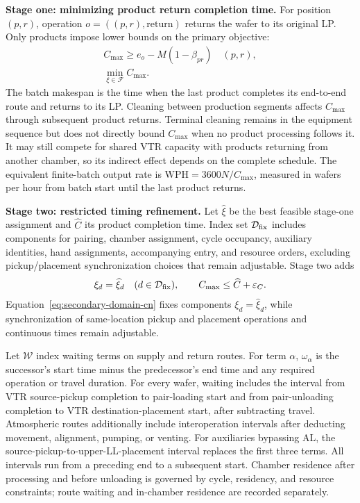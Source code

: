 \documentclass[final,5p,times,twocolumn]{elsarticle}
\begin{document}
\noindent\textbf{Stage one: minimizing product return completion time.}
For position $(p,r)$, operation $o=((p,r),\mathrm{return})$ returns the wafer to its original LP. Only products impose lower bounds on the primary objective:
\begin{equation}
\begin{gathered}
C_{\max}\ge e_o-M(1-\beta_{pr})\quad(p,r),\\
\min_{\xi\in\mathcal F}C_{\max}.
\end{gathered}
\label{eq:primary-objective-cn}
\end{equation}
The batch makespan is the time when the last product completes its end-to-end route and returns to its LP. Cleaning between production segments affects $C_{\max}$ through subsequent product returns. Terminal cleaning remains in the equipment sequence but does not directly bound $C_{\max}$ when no product processing follows it. It may still compete for shared VTR capacity with products returning from another chamber, so its indirect effect depends on the complete schedule. The equivalent finite-batch output rate is $\mathrm{WPH}=3600N/C_{\max}$, measured in wafers per hour from batch start until the last product returns.

\noindent\textbf{Stage two: restricted timing refinement.}
Let $\widehat\xi$ be the best feasible stage-one assignment and $\widehat C$ its product completion time. Index set $\mathcal D_{\rm fix}$ includes components for pairing, chamber assignment, cycle occupancy, auxiliary identities, hand assignments, accompanying entry, and resource orders, excluding pickup/placement synchronization choices that remain adjustable. Stage two adds
\begin{equation}
\begin{gathered}
\xi_d=\widehat\xi_d\quad(d\in\mathcal D_{\rm fix}),\qquad
C_{\max}\le\widehat C+\varepsilon_C.
\end{gathered}
\label{eq:secondary-domain-cn}
\end{equation}
Equation~\eqref{eq:secondary-domain-cn} fixes components $\xi_d=\widehat\xi_d$, while synchronization of same-location pickup and placement operations and continuous times remain adjustable.

Let $\mathcal W$ index waiting terms on supply and return routes. For term $\alpha$, $\omega_\alpha$ is the successor's start time minus the predecessor's end time and any required operation or travel duration. For every wafer, waiting includes the interval from VTR source-pickup completion to pair-loading start and from pair-unloading completion to VTR destination-placement start, after subtracting travel. Atmospheric routes additionally include interoperation intervals after deducting movement, alignment, pumping, or venting. For auxiliaries bypassing AL, the source-pickup-to-upper-LL-placement interval replaces the first three terms. All intervals run from a preceding end to a subsequent start. Chamber residence after processing and before unloading is governed by cycle, residency, and resource constraints; route waiting and in-chamber residence are recorded separately.
\end{document}
